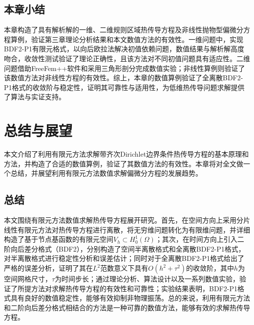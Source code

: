 \documentclass{GZUbachelorthesis}
\theoremstyle{chineseplain}
\begin{document}
\subsection{本章小结}
本章构造了具有解析解的一维、二维规则区域热传导方程及非线性抛物型偏微分方程算例，验证第三章理论分析结果和本文数值方法的有效性。一维问题中，实现BDF2-P1有限元格式，以向后欧拉法解决初值依赖问题，数值结果与解析解高度吻合，收敛性测试验证了理论正确性，且该方法对不同初值问题具有适应性。二维问题借助FreeFem++软件和采用三角形剖分完成数值实验；非线性算例则验证了该数值方法对非线性方程的有效性。综上，本章的数值算例验证了全离散BDF2-P1格式的收敛阶与稳定性，证明其可靠性与适用性，为低维热传导问题求解提供了算法与实证支持。
\clearpage
\section{总结与展望}
本文介绍了利用有限元方法求解带齐次Dirichlet边界条件热传导方程的基本原理和方法，并构造了合适的数值算例，验证了其数值方法的有效性。本章将对全文做一个总结，并展望利用有限元方法数值求解偏微分方程的发展趋势。
\subsection{总结}
本文围绕有限元方法数值求解热传导方程展开研究。首先，在空间方向上采用分片线性有限元方法对热传导方程进行离散，将无穷维问题转化为有限维问题，并详细构造了基于节点基函数的有限元空间$V_h \subset H_0^1(\Omega)$；其次，在时间方向上引入二阶向后差分格式（BDF2），分别构造了空间半离散格式和全离散BDF2-P1格式，对半离散格式进行稳定性分析和误差估计；同时对于全离散BDF2-P1格式给出了严格的误差分析，证明了其在$L^2$范数意义下具有$O(h^2 + \tau^2)$的收敛阶，其中$h$为空间网格尺寸，$\tau$为时间步长；通过理论分析、算法设计以及一系列数值实验，验证了所提方法对求解热传导方程的有效性和可靠性；实验结果表明，BDF2-P1格式具有良好的数值稳定性，能够有效抑制非物理振荡。总的来说，利用有限元方法和二阶向后差分格式相结合的方法是一种可靠的数值方法，能够有效的求解热传导方程。
\end{document}
